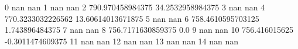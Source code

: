 0 nan nan
1 nan nan
2 790.970458984375 34.2532958984375
3 nan nan
4 770.3233032226562 13.60614013671875
5 nan nan
6 758.4610595703125 1.743896484375
7 nan nan
8 756.7171630859375 0.0
9 nan nan
10 756.416015625 -0.3011474609375
11 nan nan
12 nan nan
13 nan nan
14 nan nan
